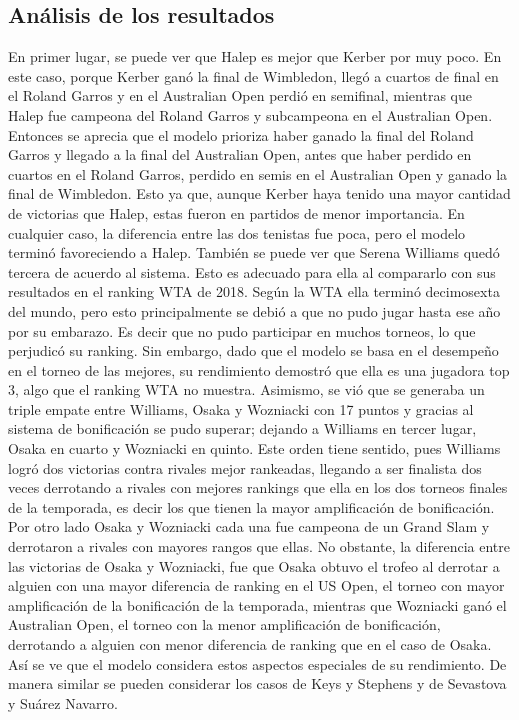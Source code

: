 \documentclass[a4paper]{article}
\begin{document}
\subsection{Análisis de los resultados}
En primer lugar, se puede ver que Halep es mejor que Kerber por muy poco. En este caso, porque Kerber ganó la final de Wimbledon, llegó a cuartos de final en el Roland Garros y en el Australian Open perdió en semifinal, mientras que Halep fue campeona del Roland Garros y subcampeona en el Australian Open. Entonces se aprecia que el modelo prioriza haber ganado la final del Roland Garros y llegado a la final del Australian Open, antes que haber perdido en cuartos en el Roland Garros, perdido en semis en el Australian Open y ganado la final de Wimbledon. Esto ya que, aunque Kerber haya tenido una mayor cantidad de victorias que Halep, estas fueron en partidos de menor importancia. En cualquier caso, la diferencia entre las dos tenistas fue poca, pero el modelo terminó favoreciendo a Halep.  \newline\newline
También se puede ver que Serena Williams quedó tercera de acuerdo al sistema. Esto es adecuado para ella al compararlo con sus resultados en el ranking WTA de 2018. Según la WTA ella terminó decimosexta del mundo, pero esto principalmente se debió a que no pudo jugar hasta ese año por su embarazo. Es decir que no pudo participar en muchos torneos, lo que perjudicó su ranking. Sin embargo, dado que el modelo se basa en el desempeño en el torneo de las mejores, su rendimiento demostró que ella es una jugadora top 3, algo que el ranking WTA no muestra. \newline\newline
Asimismo, se vió que se generaba un triple empate entre Williams, Osaka y Wozniacki con 17 puntos y gracias al sistema de bonificación se pudo superar; dejando a Williams en tercer lugar, Osaka en cuarto y Wozniacki en quinto. Este orden tiene sentido, pues Williams logró dos victorias contra rivales mejor rankeadas, llegando a ser finalista dos veces derrotando a rivales con mejores rankings que ella en los dos torneos finales de la temporada, es decir los que tienen la mayor amplificación de bonificación. Por otro lado Osaka y Wozniacki cada una fue campeona de un Grand Slam y derrotaron a rivales con mayores rangos que ellas. No obstante, la diferencia entre las victorias de Osaka y Wozniacki, fue que Osaka obtuvo el trofeo al derrotar a alguien con una mayor diferencia de ranking en el US Open, el torneo con mayor amplificación de la bonificación de la temporada, mientras que Wozniacki ganó el Australian Open, el torneo con la menor amplificación de bonificación, derrotando a alguien con menor diferencia de ranking que en el caso de Osaka. Así se ve que el modelo considera estos aspectos especiales de su rendimiento. De manera similar se pueden considerar los casos de Keys y Stephens y de Sevastova y Suárez Navarro.\newline\newline
\end{document}
